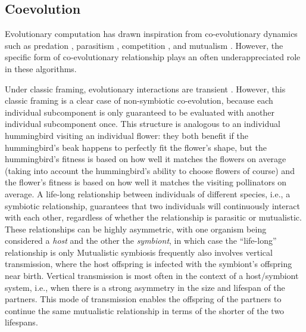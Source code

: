 \subsection{Coevolution}
\label{sec:coevolution}

Evolutionary computation has drawn inspiration from co-evolutionary dynamics such as predation \citep{willkens2022evolving,popovici2012coevolutionary, ficici2000gametheoretic}, parasitism \citep{hillis1990coevolving,  cliff1995tracking}, competition \citep{stanley2004competitive}, and mutualism \citep{wang2019paired, bucci2005identifying, bucci2003mathematical, bucci2003focusing, watson2003computational, watson2001coevolutionary}.
However, the specific form of co-evolutionary relationship plays an often underappreciated role in these algorithms.

Under classic framing, evolutionary interactions are transient \citep{potter2000cooperative,ma2018survey, pan2022effective, gong2015distributed, goh2009competitivecooperative, antonio2017coevolutionary,hancer2025survey, wiegand2004analysis, garciapedrajas2005cooperative, wiegand2001empirical, byrski2015evolutionary}.
However, this classic framing is a clear case of non-symbiotic co-evolution, because each individual subcomponent is only guaranteed to be evaluated with another individual subcomponent once.
This structure is analogous to an individual hummingbird visiting an individual flower: they both benefit if the hummingbird's beak happens to perfectly fit the flower's shape, but the hummingbird's fitness is based on how well it matches the flowers on average (taking into account the hummingbird's ability to choose flowers of course) and the flower's fitness is based on how well it matches the visiting pollinators on average.
A life-long relationship between individuals of different species, i.e., a symbiotic relationship, guarantees that two individuals will continuously interact with each other, regardless of whether the relationship is parasitic or mutualistic.
These relationships can be highly asymmetric, with one organism being considered a \textit{host} and the other the \textit{symbiont}, in which case the ``life-long'' relationship is only
Mutualistic symbiosis frequently also involves vertical transmission, where the host offspring is infected with the symbiont's offspring near birth.
Vertical transmission is most often in the context of a host/symbiont system, i.e., when there is a strong asymmetry in the size and lifespan of the partners.
This mode of transmission enables the offspring of the partners to continue the same mutualistic relationship in terms of the shorter of the two lifespans.

